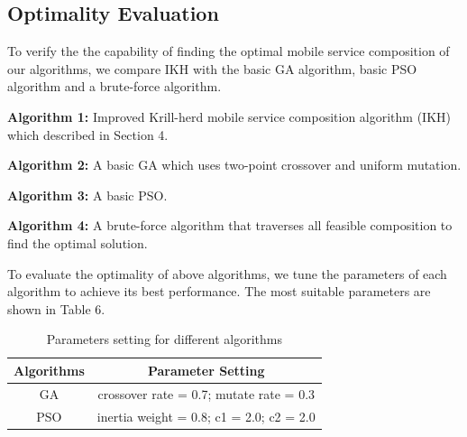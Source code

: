 \documentclass[10pt,journal,compsoc]{IEEEtran}
\begin{document}
\subsection{Optimality Evaluation}
To verify the the capability of finding the optimal mobile service composition of our algorithms, we compare IKH with the basic GA algorithm, basic PSO algorithm and a brute-force algorithm.

\textbf{Algorithm 1:} Improved Krill-herd mobile service composition algorithm (IKH) which described in Section 4.

\textbf{Algorithm 2:} A basic GA which uses two-point crossover and uniform mutation.

\textbf{Algorithm 3:} A basic PSO.

\textbf{Algorithm 4:} A brute-force algorithm that traverses all feasible composition to find the optimal solution.

To evaluate the optimality of above algorithms, we tune the parameters of each algorithm to achieve its best performance. The most suitable parameters are shown in Table 6.

\begin{table}[!t]
\renewcommand{\arraystretch}{1.3}
\caption{Parameters setting for different algorithms}
\label{table_example}
\centering
\begin{tabular}{cc}
\hline
\bfseries Algorithms & \bfseries Parameter Setting \\
\hline
GA  & crossover rate = 0.7; mutate rate = 0.3 \\
PSO & inertia weight = 0.8; c1 = 2.0; c2 = 2.0 \\
\hline
\end{tabular}
\end{table}
\end{document}
